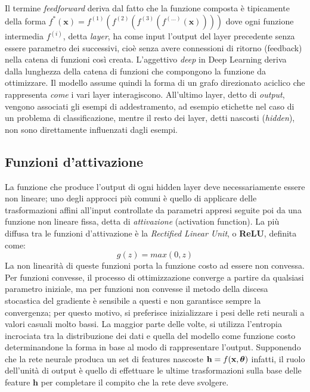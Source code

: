 \documentclass[12pt,a4paper]{report}
\begin{document}
    Il termine \textit{feedforward} deriva dal fatto che la 
    funzione composta \`e tipicamente della forma 
    $f^*(\textbf{x})=f^{(1)}(f^{(2)}(f^{(3)}(f^{(\dots)}(\textbf{x}))))$ 
    dove ogni funzione intermedia $f^{(i)}$, detta \textit{layer}, ha 
    come input l'output del layer precedente senza essere parametro dei
    successivi, cio\`e senza avere connessioni di ritorno 
    (feedback) nella catena di funzioni cos\`i creata. L'aggettivo 
    \textit{deep} in Deep Learning deriva dalla lunghezza della 
    catena di funzioni che compongono la funzione da ottimizzare.
    Il modello assume quindi la forma di un grafo direzionato
    aciclico che rappresenta \textit{come} i vari layer interagiscono.
    All'ultimo layer, detto di \textit{output}, vengono associati 
    gli esempi di addestramento, ad esempio etichette nel caso di un 
    problema di classificazione, mentre il resto dei layer, detti 
    nascosti (\textit{hidden}), non sono direttamente influenzati dagli
    esempi.
    
    \subsection{Funzioni d'attivazione} \label{sec:activation}
    La funzione che produce l'output di ogni hidden layer deve 
    necessariamente essere non lineare; uno degli approcci pi\`u 
    comuni \`e quello di applicare delle trasformazioni affini all'input
    controllate da parametri appresi seguite poi da una funzione non 
    lineare fissa, detta di \textit{attivazione} (activation function).
    La pi\`u diffusa tra le funzioni d'attivazione \`e la
    \textit{Rectified Linear Unit}, o \textbf{ReLU}, definita come:
    \begin{equation}
        g(z) = max(0, z)
    \end{equation}
    La non linearit\`a di queste funzioni porta la funzione costo ad 
    essere non convessa. Per funzioni convesse, il processo di 
    ottimizzazione converge a partire da qualsiasi parametro iniziale,
    ma per funzioni non convesse il metodo della discesa stocastica del
    gradiente \`e sensibile a questi e non garantisce sempre la 
    convergenza; per questo motivo, si preferisce inizializzare i pesi 
    delle reti neurali a valori casuali molto bassi.
    La maggior parte delle volte, si utilizza l'entropia incrociata tra
    la distribuzione dei dati e quella del modello come funzione costo
    determinandone la forma in base al modo di rappresentare l'output.
    Supponendo che la rete neurale produca un set di features nascoste
    $\textbf{h}=f(\textbf{x}, \mbox{\boldmath{$\theta$}})$ infatti, il
    ruolo dell'unit\`a di output \`e quello di effettuare le ultime 
    trasformazioni sulla base delle feature $\textbf{h}$ per completare
    il compito che la rete deve svolgere.
    
\end{document}
